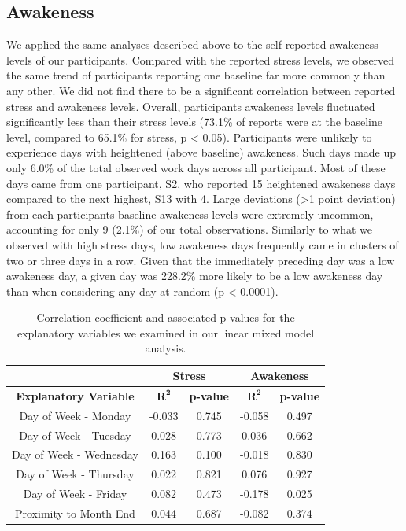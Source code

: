 \subsection{Awakeness}
We applied the same analyses described above to the self reported awakeness levels of our participants. Compared with the reported stress levels, we observed the same trend of participants reporting one baseline far more commonly than any other. We did not find there to be a significant correlation between reported stress and awakeness levels. Overall, participants awakeness levels fluctuated significantly less than their stress levels (73.1\% of reports were at the baseline level, compared to 65.1\% for stress, p < 0.05). Participants were unlikely to experience days with heightened (above baseline) awakeness. Such days made up only 6.0\% of the total observed work days across all participant. Most of these days came from one participant, S2, who reported 15 heightened awakeness days compared to the next highest, S13 with 4. Large deviations (>1 point deviation) from each participants baseline awakeness levels were extremely uncommon, accounting for only 9 (2.1\%) of our total observations. Similarly to what we observed with high stress days, low awakeness days frequently came in clusters of two or three days in a row. Given that the immediately preceding day was a low awakeness day, a given day was 228.2\% more likely to be a low awakeness day than when considering any day at random (p < 0.0001).


\begin{table}[]
    \centering
\begin{tabular}{|c|c c|c c|}
    \hline
        &
        \multicolumn{2}{c|}{Stress} & 
        \multicolumn{2}{c|}{Awakeness} \\
        \hline
        \textbf{Explanatory Variable} & $\mathbf{R^{2}}$ & \textbf{p-value} &  $\mathbf{R^{2}}$ & \textbf{p-value}\\
        \hline
        Day of Week - Monday & -0.033 & 0.745 & -0.058 & 0.497\\
        Day of Week - Tuesday & 0.028 & 0.773 & 0.036 & 0.662 \\
        Day of Week - Wednesday & 0.163 & 0.100 & -0.018 & 0.830 \\
        Day of Week - Thursday & 0.022 & 0.821 & 0.076 & 0.927 \\
        Day of Week - Friday & 0.082 & 0.473 & -0.178 & 0.025 \\
        Proximity to Month End & 0.044 & 0.687 & -0.082 & 0.374 \\
        \hline
    \end{tabular}
    \caption{Correlation coefficient and associated p-values for the explanatory variables we examined in our linear mixed model analysis.}
    \label{tab:mixedModel}
\end{table}


